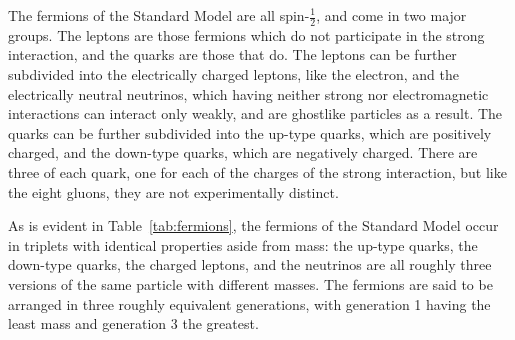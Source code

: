   The fermions of the Standard Model are all spin-$\frac{1}{2}$, and come in two major groups.
  The leptons are those fermions which do not participate in the strong interaction, and the quarks are those that do.
  The leptons can be further subdivided into the electrically charged leptons, like the electron, and the electrically neutral neutrinos, which having neither strong nor electromagnetic interactions can interact only weakly, and are ghostlike particles as a result.
  The quarks can be further subdivided into the up-type quarks, which are positively charged, and the down-type quarks, which are negatively charged.
  There are three of each quark, one for each of the charges of the strong interaction, but like the eight gluons, they are not experimentally distinct.

  As is evident in Table~\ref{tab:fermions}, the fermions of the Standard Model occur in triplets with identical properties aside from mass: the up-type quarks, the down-type quarks, the charged leptons, and the neutrinos are all roughly three versions of the same particle with different masses.
  The fermions are said to be arranged in three roughly equivalent generations, with generation 1 having the least mass and generation 3 the greatest.

